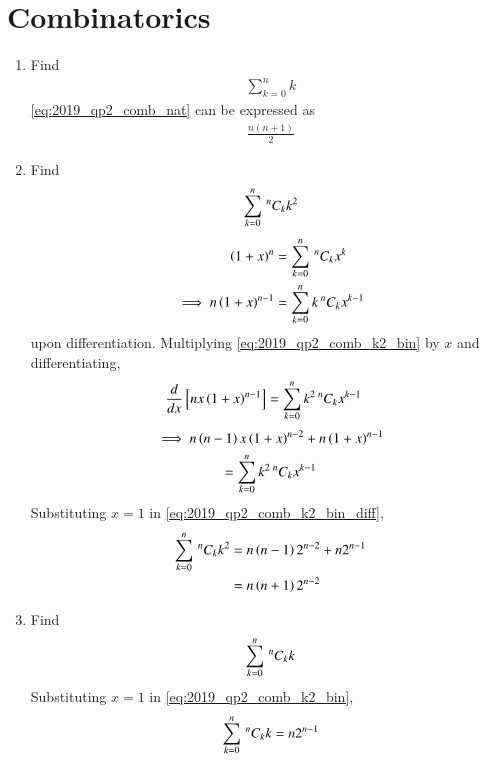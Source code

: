 \documentclass[journal,12pt,twocolumn]{IEEEtran}
\renewcommand\thesection{\arabic{section}}
\begin{document}
\section{Combinatorics}
\begin{enumerate}[label=\thesection.\arabic*
,ref=\thesection.\theenumi]
\item Find 
\begin{align}
\label{eq:2019_qp2_comb_nat}
\sum_{k=0}^{n}k
\end{align}
\solution  \eqref{eq:2019_qp2_comb_nat} can be expressed as
\begin{align}
\label{eq:2019_qp2_comb_nat_sol}
\frac{n(n+1)}{2}
\end{align}
\item Find 
\begin{align}
\label{eq:2019_qp2_comb_k2}
\sum_{k=0}^{n}\,^{n}C_{k}k^2
\end{align}
\solution 
\begin{align}
\label{eq:2019_qp2_comb}
\left(1+x\right)^n&=\sum_{k=0}^{n}\,^{n}C_{k}x^k
\\
\implies n\left(1+x\right)^{n-1}&=\sum_{k=0}^{n}k\,^{n}C_{k}x^{k-1}
\label{eq:2019_qp2_comb_k2_bin}
\end{align}
upon differentiation. Multiplying \eqref{eq:2019_qp2_comb_k2_bin} by $x$ and differentiating,
\begin{align}
\frac{d}{dx} {}\left[nx\left(1+x\right)^{n-1}\right]&=\sum_{k=0}^{n}k^2\,^{n}C_{k}x^{k-1}
\end{align}
\begin{multline}
\implies n\left(n-1\right)x\left(1+x\right)^{n-2}+n\left(1+x\right)^{n-1}  
\\
=\sum_{k=0}^{n}k^2\,^{n}C_{k}x^{k-1}
\label{eq:2019_qp2_comb_k2_bin_diff}
\end{multline}
%
Substituting $x=1$ in \eqref{eq:2019_qp2_comb_k2_bin_diff},
\begin{align}
\sum_{k=0}^{n}\,^{n}C_{k}k^2 &= n\left(n-1\right)2^{n-2}+n2^{n-1}
\nonumber \\
&= n\left(n+1\right)2^{n-2}
\label{eq:2019_qp2_comb_k2_bin_sol}
\end{align}
\item Find 
\begin{align}
\label{eq:2019_qp2_comb_k}
\sum_{k=0}^{n}\,^{n}C_{k}k
\end{align}
\solution Substituting $x=1$ in \eqref{eq:2019_qp2_comb_k2_bin},
\begin{align}
\label{eq:2019_qp2_comb_k_sol} 
\sum_{k=0}^{n}\,^{n}C_{k}k= n2^{n-1}
\end{align}

\end{enumerate}
\end{document}
